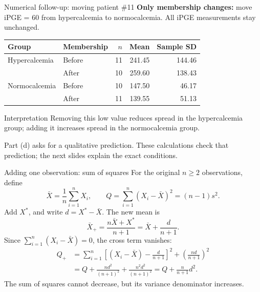 \documentclass[aspectratio=169,11pt]{beamer}
\begin{document}
\begin{frame}{Numerical follow-up: moving patient \#11}
  \textbf{Only membership changes:} move iPGE = 60 from hypercalcemia
  to normocalcemia. All iPGE measurements stay unchanged.
  \begin{center}
    \begin{tabular}{llrrr}
      \toprule
      Group & Membership & \(n\) & Mean & Sample SD \\
      \midrule
      Hypercalcemia & Before & 11 & 241.45 & 144.46 \\
                    & After  & 10 & 259.60 & 138.43 \\
      \midrule
      Normocalcemia & Before & 10 & 147.50 & 46.17 \\
                    & After  & 11 & 139.55 & 51.13 \\
      \bottomrule
    \end{tabular}
  \end{center}
  \begin{alertblock}{Interpretation}
    Removing this low value reduces spread in the hypercalcemia group;
    adding it increases spread in the normocalcemia group.
  \end{alertblock}
  \small Part (d) asks for a qualitative prediction. These calculations check
  that prediction; the next slides explain the exact conditions.
\end{frame}

\begin{frame}{Adding one observation: sum of squares}
  \small
  For the original \(n\geq2\) observations, define
  \[
    \bar X=\frac1n\sum_{i=1}^n X_i,\qquad
    Q=\sum_{i=1}^n(X_i-\bar X)^2=(n-1)s^2.
  \]
  Add \(X^*\), and write \(d=X^*-\bar X\). The new mean is
  \[
    \bar X_+=\frac{n\bar X+X^*}{n+1}=\bar X+\frac{d}{n+1}.
  \]
  Since \(\sum_{i=1}^n(X_i-\bar X)=0\), the cross term vanishes:
  \[
  \begin{aligned}
    Q_+&=\sum_{i=1}^n\left[(X_i-\bar X)-\frac{d}{n+1}\right]^2
         +\left(\frac{nd}{n+1}\right)^2\\
       &=Q+\frac{nd^2}{(n+1)^2}+\frac{n^2d^2}{(n+1)^2}
        ={Q+\frac{n}{n+1}d^2}.
  \end{aligned}
  \]
  \alert{The sum of squares cannot decrease, but its variance denominator increases.}
\end{frame}
\end{document}
